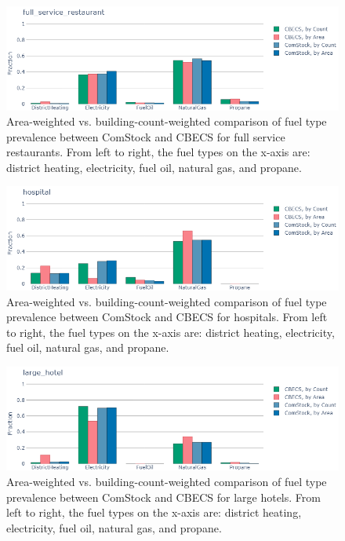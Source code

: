 \begin{figure}
  \centering
  \includegraphics[scale=0.5]{figures/cbecs_comstock_fuel_comparison_full_service_restaurant.png}
  \caption[Comparison of fuel type prevalence between ComStock and CBECS for full service restaurants]{Area-weighted vs. building-count-weighted comparison of fuel type prevalence between ComStock and CBECS for full service restaurants. From left to right, the fuel types on the x-axis are: district heating, electricity, fuel oil, natural gas, and propane.}
\label{fig:cbecs_comstock_fuel_comparison_full_service_restaurant}
\end{figure}

\begin{figure}
  \centering
  \includegraphics[scale=0.5]{figures/cbecs_comstock_fuel_comparison_hospital.png}
  \caption[Comparison of fuel type prevalence between ComStock and CBECS for hospitals]{Area-weighted vs. building-count-weighted comparison of fuel type prevalence between ComStock and CBECS for hospitals. From left to right, the fuel types on the x-axis are: district heating, electricity, fuel oil, natural gas, and propane.}
  \label{fig:cbecs_comstock_fuel_comparison_hospital}
\end{figure}

\begin{figure}
  \centering
  \includegraphics[scale=0.5]{figures/cbecs_comstock_fuel_comparison_large_hotel.png}
  \caption[Comparison of fuel type prevalence between ComStock and CBECS for large hotels]{Area-weighted vs. building-count-weighted comparison of fuel type prevalence between ComStock and CBECS for large hotels. From left to right, the fuel types on the x-axis are: district heating, electricity, fuel oil, natural gas, and propane.}
  \label{fig:cbecs_comstock_fuel_comparison_large_hotel}
\end{figure}

